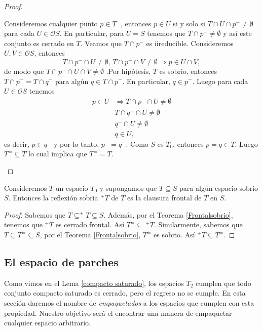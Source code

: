 \begin{proof}
\begin{description}
    Consideremos cualquier punto $p\in T^=$, entonces $p\in U$ si y solo si $T\cap U\cap p^-\neq \emptyset$ para cada $U\in \mathcal{O}S$. En particular, para $U=S$ tenemos que $T\cap p^-\neq \emptyset$ y así este conjunto es cerrado en $T$. Veamos que  $T\cap p^-$ es iireducible. Consideremos $U, V\in \mathcal{O}S$, entonces
    \[
    T\cap p^-\cap U\neq \emptyset,\, T\cap p^-\cap V\neq \emptyset \Rightarrow p\in U\cap V,
    \]
    de modo que $T\cap p^-\cap U\cap V\neq \emptyset$ .Por hipótesis, $T$ es sobrio, entonces $T\cap p^-=T\cap q^-$ para algún $q\in T\cap p^-$. En particular, $q\in p^-$. Luego para cada $U\in \mathcal{O}S$ tenemos 
    \[
    \begin{split}
        p\in U & \Rightarrow T\cap p^-\cap U\neq \emptyset\\
        & T\cap q^- \cap U\neq \emptyset\\
        & q^-\cap U\neq \emptyset\\
        & q\in U,
    \end{split}
    \]
    es decir, $p\in q^-$ y por lo tanto, $p^-=q^-$. Como $S$ es $T_0$, entonces $p=q\in T$. Luego $T^=\subseteq T$ lo cual implica que $T^==T$.
\end{description}
\end{proof}

\begin{cor}
    Consideremos $T$ un espacio $T_0$ y supongamos que $T\subseteq S$ para algún espacio sobrio $S$. Entonces la reflexión sobria $^+T$ de $T$ es la clausura frontal de $T$ en $S$.
\end{cor}

\begin{proof}
    Sabemos que $T\subseteq ^+ T\subseteq S$. Además, por el Teorema \ref{Frontalsobrio}, tenemos que $^+T$ es cerrado frontal. Así $T^=\subseteq\, ^+T$. Similarmente, sabemos que $T\subseteq T^=\subseteq S$, por el Teorema \ref{Frontalsobrio}, $T^=$ es sobrio. Así $^+T\subseteq T^=$.
\end{proof}

\subsection{El espacio de parches}\label{Parche puntos}

Como vimos en el Lema \ref{compacto saturado}, los espacios $T_2$ cumplen que todo conjunto compacto saturado es cerrado, pero el regreso no se cumple.  En esta sección daremos el nombre de \emph{empaquetados} a los espacios que cumplen con esta propiedad. Nuestro objetivo será el encontrar una manera de empaquetar cualquier espacio arbitrario.

